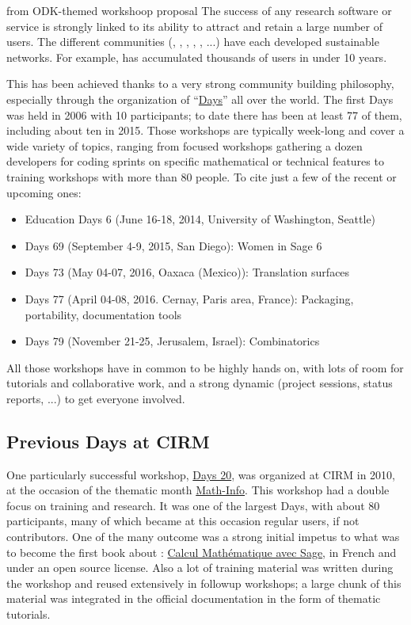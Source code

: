\begin{oldpart}{from ODK-themed workshoop proposal}
The success of any research software or service is strongly linked to
its ability to attract and retain a large number of users. The
different communities (\Sage, \GAP, \Pari, \Singular, \Jupyter, ...)
have each developed sustainable networks. For example, \Sage has
accumulated thousands of users in under 10 years.

This has been achieved thanks to a very strong community building
philosophy, especially through the organization of
“\href{https://wiki.sagemath.org/Workshops}{\Sage Days}” all over the
world. The first \Sage Days was held in 2006 with 10 participants; to
date there has been at least 77 of them, including about ten in
2015. Those workshops are typically week-long and cover a wide
variety of topics, ranging from focused workshops gathering a dozen
developers for coding sprints on specific mathematical or technical
features to training workshops with more than 80 people. To cite just
a few of the recent or upcoming ones:

\begin{itemize}
\item \Sage Education Days 6 (June 16-18, 2014, University of
  Washington, Seattle)
\item \Sage Days 69 (September 4-9, 2015, San Diego): Women in Sage 6
\item \Sage Days 73 (May 04-07, 2016, Oaxaca (Mexico)): Translation surfaces
\item \Sage Days 77 (April 04-08, 2016. Cernay, Paris area, France):
  Packaging, portability, documentation tools
\item \Sage Days 79 (November 21-25, Jerusalem, Israel): Combinatorics
\end{itemize}

All those workshops have in common to be highly hands on, with lots of
room for tutorials and collaborative work, and a strong dynamic
(project sessions, status reports, ...) to get everyone involved.

\subsection{Previous \Sage Days at CIRM}

One particularly successful workshop,
\href{https://www.lirmm.fr/arith/wiki/MathInfo2010/SageDays}{\Sage
  Days 20}, was organized at CIRM in 2010, at the occasion of the
thematic month
\href{https://www.lirmm.fr/arith/wiki/MathInfo2010/}{Math-Info}. This
workshop had a double focus on training and research. It was one of
the largest \Sage Days, with about 80 participants, many of which
became at this occasion regular \Sage users, if not contributors. One
of the many outcome was a strong initial impetus to what was to become
the first book about \Sage: \href{http://sagebook.gforge.inria.fr/}{Calcul Mathématique avec
Sage}, in French and under an open
source license. Also a lot of training material was written during the
workshop and reused extensively in followup workshops; a large chunk
of this material was integrated in the \Sage official documentation in
the form of thematic tutorials.


\end{oldpart}
